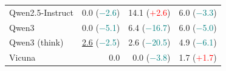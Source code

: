 \begin{table}[ht]
\begin{tabular}{lrrr}
\quad Qwen2.5-Instruct & 0.0 {\scriptsize(\textcolor{teal}{$-$2.6})} & 14.1 {\scriptsize(\textcolor{red}{$+$2.6})} &  6.0 {\scriptsize(\textcolor{teal}{$-$3.3})} \\
\quad Qwen3          & 0.0 {\scriptsize(\textcolor{teal}{$-$5.1})} & 6.4 {\scriptsize(\textcolor{teal}{$-$16.7})} & 6.0 {\scriptsize(\textcolor{teal}{$-$5.0})} \\
\quad Qwen3 (think)  & \underline{2.6} {\scriptsize(\textcolor{teal}{$-$2.5})} & 2.6 {\scriptsize(\textcolor{teal}{$-$20.5})} & 4.9 {\scriptsize(\textcolor{teal}{$-$6.1})} \\
\quad Vicuna         & 0.0 & 0.0 {\scriptsize(\textcolor{teal}{$-$3.8})} &  1.7 {\scriptsize(\textcolor{red}{$+$1.7})} \\
\bottomrule
\end{tabular}
\end{table}
